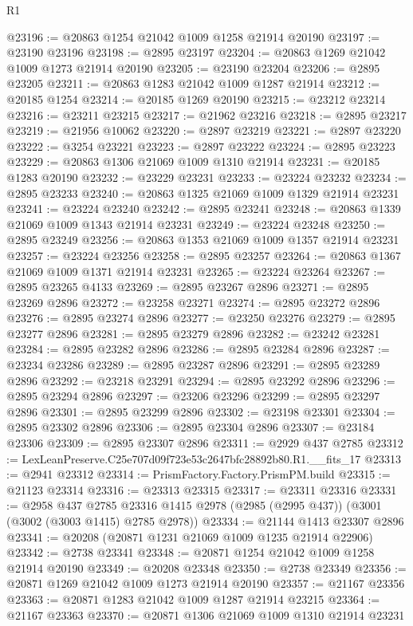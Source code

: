 \begin{lexlean}{R1}
\begin{coremodule}
@23196 := @20863 @1254 @21042 @1009 @1258 @21914 @20190
@23197 := @23190 @23196
@23198 := @2895 @23197
@23204 := @20863 @1269 @21042 @1009 @1273 @21914 @20190
@23205 := @23190 @23204
@23206 := @2895 @23205
@23211 := @20863 @1283 @21042 @1009 @1287 @21914
@23212 := @20185 @1254
@23214 := @20185 @1269 @20190
@23215 := @23212 @23214
@23216 := @23211 @23215
@23217 := @21962 @23216
@23218 := @2895 @23217
@23219 := @21956 @10062
@23220 := @2897 @23219
@23221 := @2897 @23220
@23222 := @3254 @23221
@23223 := @2897 @23222
@23224 := @2895 @23223
@23229 := @20863 @1306 @21069 @1009 @1310 @21914
@23231 := @20185 @1283 @20190
@23232 := @23229 @23231
@23233 := @23224 @23232
@23234 := @2895 @23233
@23240 := @20863 @1325 @21069 @1009 @1329 @21914 @23231
@23241 := @23224 @23240
@23242 := @2895 @23241
@23248 := @20863 @1339 @21069 @1009 @1343 @21914 @23231
@23249 := @23224 @23248
@23250 := @2895 @23249
@23256 := @20863 @1353 @21069 @1009 @1357 @21914 @23231
@23257 := @23224 @23256
@23258 := @2895 @23257
@23264 := @20863 @1367 @21069 @1009 @1371 @21914 @23231
@23265 := @23224 @23264
@23267 := @2895 @23265 @4133
@23269 := @2895 @23267 @2896
@23271 := @2895 @23269 @2896
@23272 := @23258 @23271
@23274 := @2895 @23272 @2896
@23276 := @2895 @23274 @2896
@23277 := @23250 @23276
@23279 := @2895 @23277 @2896
@23281 := @2895 @23279 @2896
@23282 := @23242 @23281
@23284 := @2895 @23282 @2896
@23286 := @2895 @23284 @2896
@23287 := @23234 @23286
@23289 := @2895 @23287 @2896
@23291 := @2895 @23289 @2896
@23292 := @23218 @23291
@23294 := @2895 @23292 @2896
@23296 := @2895 @23294 @2896
@23297 := @23206 @23296
@23299 := @2895 @23297 @2896
@23301 := @2895 @23299 @2896
@23302 := @23198 @23301
@23304 := @2895 @23302 @2896
@23306 := @2895 @23304 @2896
@23307 := @23184 @23306
@23309 := @2895 @23307 @2896
@23311 := @2929 @437 @2785
@23312 := LexLeanPreserve.C25e707d09f723e53c2647bfc28892b80.R1.__fits_17
@23313 := @2941 @23312
@23314 := PrismFactory.Factory.PrismPM.build
@23315 := @21123 @23314
@23316 := @23313 @23315
@23317 := @23311 @23316
@23331 := @2958
    @437
    @2785
    @23316
    @1415
    @2978
    (@2985 (@2995 @437))
    (@3001 (@3002 (@3003 @1415) @2785 @2978))
@23334 := @21144 @1413 @23307 @2896
@23341 := @20208 (@20871 @1231 @21069 @1009 @1235 @21914 @22906)
@23342 := @2738 @23341
@23348 := @20871 @1254 @21042 @1009 @1258 @21914 @20190
@23349 := @20208 @23348
@23350 := @2738 @23349
@23356 := @20871 @1269 @21042 @1009 @1273 @21914 @20190
@23357 := @21167 @23356
@23363 := @20871 @1283 @21042 @1009 @1287 @21914 @23215
@23364 := @21167 @23363
@23370 := @20871 @1306 @21069 @1009 @1310 @21914 @23231

\end{coremodule}
\end{lexlean}
